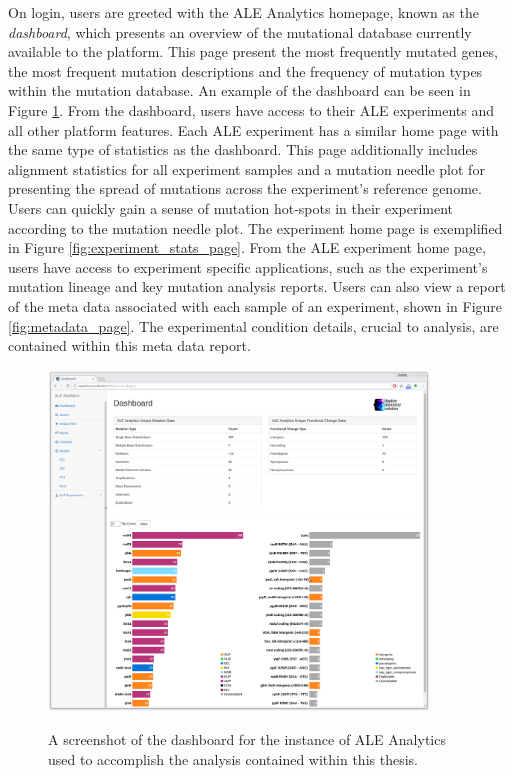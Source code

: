 \documentclass[12pt,final,masters,chapterheads]{ucsd}  %
\begin{document}
On login, users are greeted with the ALE Analytics homepage, known as the \textit{dashboard}, which presents an overview of the mutational database currently available to the platform. This page present the most frequently mutated genes, the most frequent mutation descriptions and the frequency of mutation types within the mutation database. An example of the dashboard can be seen in Figure \ref{fig:dashboard_page}. From the dashboard, users have access to their ALE experiments and all other platform features. Each ALE experiment has a similar home page with the same type of statistics as the dashboard. This page additionally includes alignment statistics for all experiment samples and a mutation needle plot \cite{michael_p_schroeder_2015_14561} for presenting the spread of mutations across the experiment's reference genome. Users can quickly gain a sense of mutation hot-spots in their experiment according to the mutation needle plot. The experiment home page is exemplified in Figure \ref{fig:experiment_stats_page}. From the ALE experiment home page, users have access to experiment specific applications, such as the experiment's mutation lineage and key mutation analysis reports. Users can also view a report of the meta data associated with each sample of an experiment, shown in Figure \ref{fig:metadata_page}. The experimental condition details, crucial to analysis, are contained within this meta data report.
\begin{figure}[H]
  \caption{A screenshot of the dashboard for the instance of ALE Analytics used to accomplish the analysis contained within this thesis.}
  \centering
  \includegraphics[width=0.9\textwidth]{dashboard_page.png}
  \label{fig:dashboard_page}
\end{figure}
\end{document}
